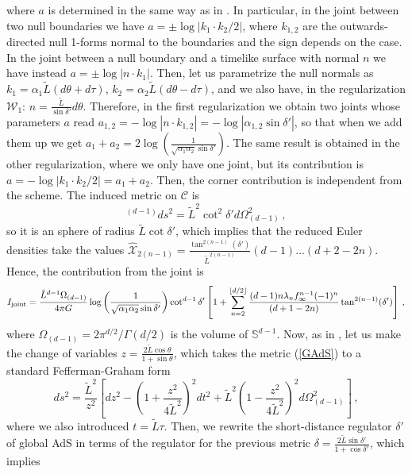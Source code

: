 \documentclass[11pt,letterpaper]{article}
\begin{document}
where $a$ is determined in the same way as in \cite{Lehner:2016vdi,Carmi:2016wjl}. In particular, in the joint between two null boundaries we have $a=\pm\log|k_1\cdot k_2/2|$, where $k_{1,2}$ are the outwards-directed null 1-forms normal to the boundaries and the sign depends on the case. In the joint between a null boundary and a timelike surface with normal $n$ we have instead $a=\pm\log|n\cdot k_1|$. Then, let us parametrize the null normals as $k_1=\alpha_1\tilde L(d\theta+d\tau)$, $k_2=\alpha_2\tilde L (d\theta-d\tau)$, and we also have, in the regularization $\mathcal{W}_1$: $n=\frac{\tilde L}{\sin\delta'}d\theta$. Therefore, in the first regularization we obtain two joints whose parameters $a$ read $a_{1,2}=-\log|n\cdot k_{1,2}|=-\log|\alpha_{1,2} \sin\delta'|$, so that when we add them up we get $a_1+a_2=2\log\left(\frac{1}{\sqrt{\alpha_1\alpha_2}\sin\delta'}\right)$. The same result is obtained in the other regularization, where we only have one joint, but its contribution is $a=-\log|k_1\cdot k_2/2|=a_1+a_2$. Then, the corner contribution is independent from the scheme. The induced metric on $\mathcal{C}$ is
\begin{equation}
^{(d-1)}ds^2=\tilde L^2 \cot^2\delta' d\Omega_{(d-1)}^2\, ,
\end{equation}
so it is an sphere of radius $\tilde L \cot\delta'$, which implies that the reduced Euler densities take the values $\hat{\mathcal{X}}_{2(n-1)}=\frac{\tan^{2(n-1)}(\delta')}{\tilde L^{2(n-1)}}(d-1)\ldots(d+2-2n)$. Hence, the contribution from the joint is
\begin{equation}
I_{\rm joint}=\frac{\tilde L^{d-1}\Omega_{(d-1)}}{4\pi G} \log\left(\frac{1}{\sqrt{\alpha_1\alpha_2}\sin\delta'}\right)\cot^{d-1}\delta'\left[1+\sum_{n=2}^{\lfloor d/2\rfloor}\frac{(d-1)n \lambda_n f_{\infty}^{n-1}(-1)^{n}}{(d+1-2n)}\tan^{2(n-1)}(\delta')\right]\, ,
\end{equation}
where $\Omega_{(d-1)}=2\pi^{d/2}/\Gamma(d/2)$ is the volume of $\mathbb{S}^{d-1}$.
Now, as in \cite{Carmi:2016wjl}, let us make the change of variables $z=\frac{2\tilde L\cos\theta}{1+\sin\theta}$, which takes the metric (\ref{GAdS}) to a standard Fefferman-Graham form 
\begin{equation}\label{FG}
ds^2=\frac{\tilde L^2}{z^2}\left[dz^2-\left(1+\frac{z^2}{4\tilde L^2}\right)^2dt^2+ \tilde L^2\left(1-\frac{z^2}{4\tilde L^2}\right)^2d\Omega_{(d-1)}^2\right]\, ,
\end{equation}
where we also introduced $t=\tilde L \tau$. Then, we rewrite the short-distance regulator $\delta'$ of global AdS in terms of the regulator for the previous metric $\delta=\frac{2\tilde L\sin\delta'}{1+\cos\delta'}$, which implies
\end{document}
